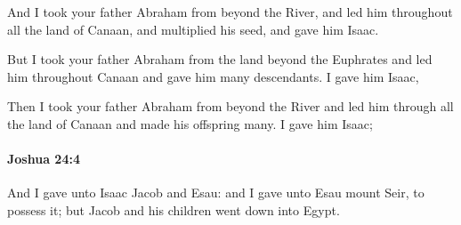 			\begin{versebox}
					\item[BHS] 
					\item[ASV] And I took your father Abraham from beyond the River, and led him throughout all the land of Canaan, and multiplied his seed, and gave him Isaac.
					\item[NIV] But I took your father Abraham from the land beyond the Euphrates and led him throughout Canaan and gave him many descendants. I gave him Isaac,
					\item[NRSV] Then I took your father Abraham from beyond the River and led him through all the land of Canaan and made his offspring many. I gave him Isaac;
			\end{versebox}

		\paragraph{Joshua 24:4} %
			\label{JOSHUA-24-4}

			And I gave unto Isaac Jacob and Esau: and I gave unto Esau mount Seir, to possess it; but Jacob and his children went down into Egypt.


